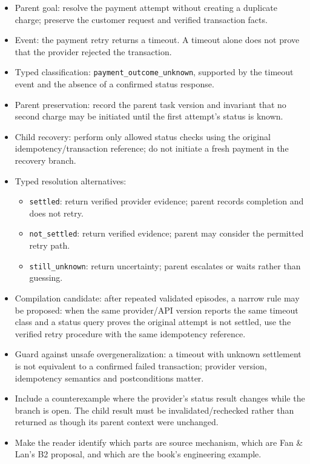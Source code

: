 \begin{itemize}
\tightlist
\item
  Parent goal: resolve the payment attempt without creating a duplicate charge; preserve the customer request and verified transaction facts.
\item
  Event: the payment retry returns a timeout. A timeout alone does not prove that the provider rejected the transaction.
\item
  Typed classification: \texttt{payment\_outcome\_unknown}, supported by the timeout event and the absence of a confirmed status response.
\item
  Parent preservation: record the parent task version and invariant that no second charge may be initiated until the first attempt's status is known.
\item
  Child recovery: perform only allowed status checks using the original idempotency/transaction reference; do not initiate a fresh payment in the recovery branch.
\item
  Typed resolution alternatives:

  \begin{itemize}
  \tightlist
  \item
    \texttt{settled}: return verified provider evidence; parent records completion and does not retry.
  \item
    \texttt{not\_settled}: return verified evidence; parent may consider the permitted retry path.
  \item
    \texttt{still\_unknown}: return uncertainty; parent escalates or waits rather than guessing.
  \end{itemize}
\item
  Compilation candidate: after repeated validated episodes, a narrow rule may be proposed: when the same provider/API version reports the same timeout class and a status query proves the original attempt is not settled, use the verified retry procedure with the same idempotency reference.
\item
  Guard against unsafe overgeneralization: a timeout with unknown settlement is not equivalent to a confirmed failed transaction; provider version, idempotency semantics and postconditions matter.
\item
  Include a counterexample where the provider's status result changes while the branch is open. The child result must be invalidated/rechecked rather than returned as though its parent context were unchanged.
\item
  Make the reader identify which parts are source mechanism, which are Fan \& Lan's B2 proposal, and which are the book's engineering example.
\end{itemize}

